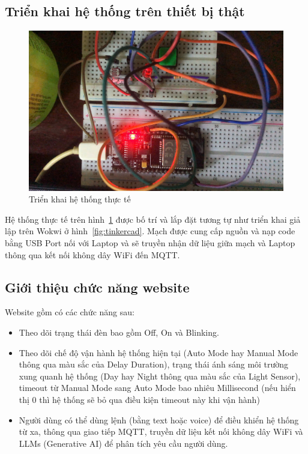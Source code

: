 {\subsection{Triển khai hệ thống trên thiết bị thật}
\begin{figure}[H]
    \centering
    \includegraphics[width=\textwidth]{img/realSystem.jpg}
    \caption{Triển khai hệ thống thực tế}
    \label{fig:real_1}
\end{figure}


Hệ thống thực tế trên hình~\ref{fig:real_1} được bố trí và lắp đặt tương tự như triển khai giả lập trên Wokwi ở hình~\ref{fig:tinkercad}. Mạch được cung cấp nguồn và nạp code bằng USB Port nối với Laptop và sẽ truyền nhận dữ liệu giữa mạch và Laptop thông qua kết nối không dây WiFi đến MQTT. 


\pagebreak
\subsection{Giới thiệu chức năng website}
Website gồm có các chức năng sau: 
\begin{itemize}
    \item Theo dõi trạng thái đèn bao gồm Off, On và Blinking.
    \item Theo dõi chế độ vận hành hệ thống hiện tại (Auto Mode hay Manual Mode thông qua màu sắc của Delay Duration), trạng thái ánh sáng môi trường xung quanh hệ thống (Day hay Night thông qua màu sắc của Light Sensor), timeout từ Manual Mode sang Auto Mode bao nhiêu Millisecond (nếu hiển thị 0 thì hệ thống sẽ bỏ qua điều kiện timeout này khi vận hành)
    \item Người dùng có thể dùng lệnh (bằng text hoặc voice) để điều khiển hệ thống từ xa, thông qua giao tiếp MQTT, truyền dữ liệu kết nối không dây WiFi và LLMs (Generative AI) để phân tích yêu cầu người dùng.
\end{itemize}


}
